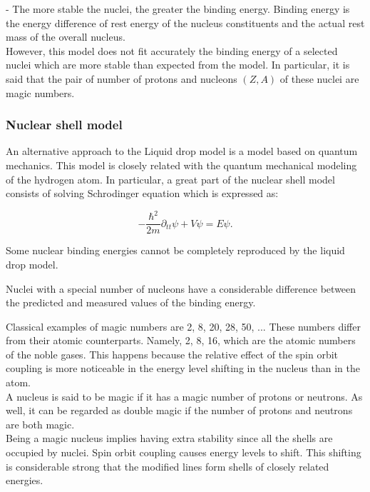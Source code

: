 \documentclass[openany]{book}
\begin{document}
-	The more stable the nuclei, the greater the binding energy.
Binding energy is the energy difference of rest energy of the nucleus constituents and the actual  rest mass of the overall nucleus. \\

However, this model does not fit accurately the binding energy of a selected nuclei which are more stable than expected from the model. In particular, it is said that the pair of number of protons and nucleons $(Z, A)$ of these nuclei are magic numbers. 



\subsubsection{Nuclear shell model}  \label{ssub:nuclearShellModel}

An alternative approach to the Liquid drop model is a model based on quantum mechanics. This model is closely related with the quantum mechanical modeling of the hydrogen atom. In particular, a great part of the nuclear shell model consists of solving Schrodinger equation which is expressed as:

\begin{equation} \label{eq:nuclearShell_schrodinger}
	- \frac{\hbar^2}{2m} \partial_{tt} \psi + V  \psi = E \psi.
\end{equation}


Some nuclear binding energies cannot be completely reproduced by the liquid drop model. 

Nuclei with a special number of nucleons have a considerable difference between the predicted and measured values of the binding energy.

Classical examples of magic numbers are 2, 8, 20, 28, 50, ... These numbers differ from their atomic counterparts. Namely, 2, 8, 16, which are the atomic numbers of the noble gases. This happens because the relative effect of the spin orbit coupling is more noticeable in the energy level shifting in the nucleus than in the atom.\\


A nucleus is said to be magic if it has a magic number of protons or neutrons. As well, it can be regarded as double magic if the number of protons and neutrons are both magic. \\

Being a magic nucleus implies having extra stability since all the shells are occupied by nuclei.  Spin orbit coupling causes energy levels to shift. This shifting is considerable strong that the modified lines form shells of closely related energies.  \\
\end{document}
